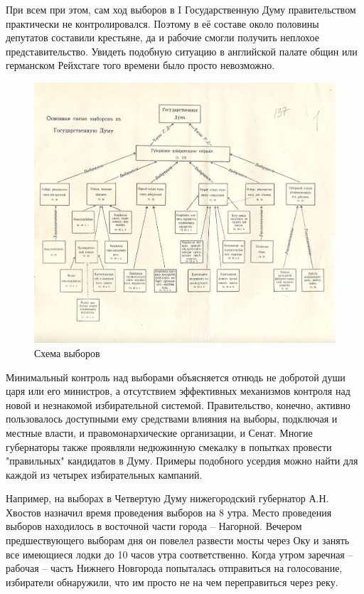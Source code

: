 При всем при этом, сам ход выборов в I Государственную Думу правительством практически не контролировался. Поэтому в её составе около половины депутатов составили крестьяне, да и рабочие смогли получить неплохое представительство. Увидеть подобную ситуацию в английской палате общин или германском Рейхстаге того времени было просто невозможно.

\begin{figure}[h!tb] 
	\centering\includegraphics[scale=0.3]{Data/Vybory_V_Dumu/Ho9O9pYTirw.jpg}
	\caption{Схема выборов}%
\end{figure}

Минимальный контроль над выборами объясняется отнюдь не добротой души царя или его министров, а отсутствием эффективных механизмов контроля над новой и незнакомой избирательной системой. Правительство, конечно, активно пользовалось доступными ему средствами влияния на выборы, подключая и местные власти, и правомонархические организации, и Сенат. Многие губернаторы также проявляли недюжинную смекалку в попытках провести "правильных" кандидатов в Думу. Примеры подобного усердия можно найти для каждой из четырех избирательных кампаний.

Например, на выборах в Четвертую Думу нижегородский губернатор А.Н. Хвостов назначил время проведения выборов на 8 утра. Место проведения выборов находилось в восточной части города – Нагорной. Вечером предшествующего выборам дня он повелел развести мосты через Оку и занять все имеющиеся лодки до 10 часов утра соответственно. Когда утром заречная – рабочая – часть Нижнего Новгорода попыталась отправиться на голосование, избиратели обнаружили, что им просто не на чем переправиться через реку.

